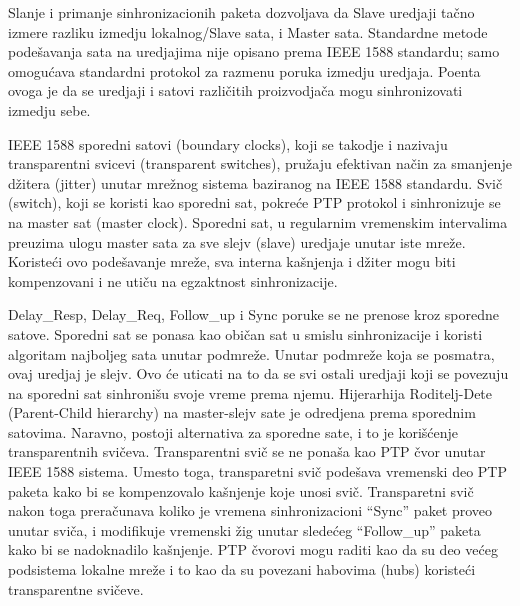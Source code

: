 \documentclass[a4paper,12pt, master]{etf}
\begin{document}
	Slanje i primanje sinhronizacionih paketa dozvoljava da Slave uredjaji ta\v{c}no izmere
	razliku izmedju lokalnog/Slave sata, i Master sata. Standardne metode pode\v{s}avanja sata na
	uredjajima nije opisano prema IEEE 1588 standardu; samo omogu\'{c}ava standardni protokol za
	razmenu poruka izmedju uredjaja. Poenta ovoga je da se uredjaji i satovi razli\v{c}itih
	proizvodja\v{c}a mogu sinhronizovati izmedju sebe.


	IEEE 1588 sporedni satovi (boundary clocks), koji se takodje i nazivaju
	transparentni svicevi (transparent switches), pru\v{z}aju efektivan na\v{c}in za
	smanjenje d\v{z}itera (jitter) unutar mre\v{z}nog sistema baziranog na IEEE 1588
	standardu. Svi\v{c} (switch), koji se koristi kao sporedni sat, pokre\'{c}e PTP protokol i
	sinhronizuje se na master sat (master clock). Sporedni sat, u regularnim vremenskim intervalima
	preuzima ulogu master sata za sve slejv (slave) uredjaje unutar iste mre\v{z}e.
        Koriste\'{c}i ovo pode\v{s}avanje mre\v{z}e, sva interna ka\v{s}njenja i d\v{z}iter mogu biti
        kompenzovani i ne uti\v{c}u na egzaktnost sinhronizacije.

	Delay\_Resp, Delay\_Req, Follow\_up i Sync poruke se ne prenose kroz sporedne satove.
	Sporedni sat se ponasa kao obi\v{c}an sat u smislu sinhronizacije i koristi algoritam
	najboljeg sata unutar podmre\v{z}e. Unutar podmre\v{z}e koja se posmatra, ovaj uredjaj je slejv.
	Ovo \'{c}e uticati na to da se svi ostali uredjaji koji se povezuju na sporedni sat
	sinhroni\v{s}u svoje vreme prema njemu. Hijerarhija Roditelj-Dete (Parent-Child hierarchy) na
	master-slejv sate je odredjena prema sporednim satovima. Naravno, postoji alternativa za sporedne sate,
	i to je kori\v{s}\'{c}enje transparentnih svi\v{c}eva. Transparentni svi\v{c} se ne pona\v{s}a kao
	PTP \v{c}vor unutar IEEE 1588 sistema. Umesto toga, transparetni svi\v{c} pode\v{s}ava
	vremenski deo PTP paketa kako bi se kompenzovalo ka\v{s}njenje koje unosi svi\v{c}. Transparetni
	svi\v{c} nakon toga prera\v{c}unava koliko je vremena sinhronizacioni ``Sync'' paket proveo unutar
	svi\v{c}a, i modifikuje vremenski \v{z}ig unutar slede\'{c}eg ``Follow\_up'' paketa kako bi se
	nadoknadilo ka\v{s}njenje. PTP \v{c}vorovi mogu raditi kao da su deo ve\'{c}eg podsistema lokalne mre\v{z}e
	i to kao da su povezani habovima (hubs) koriste\'{c}i transparentne svi\v{c}eve.
\end{document}

